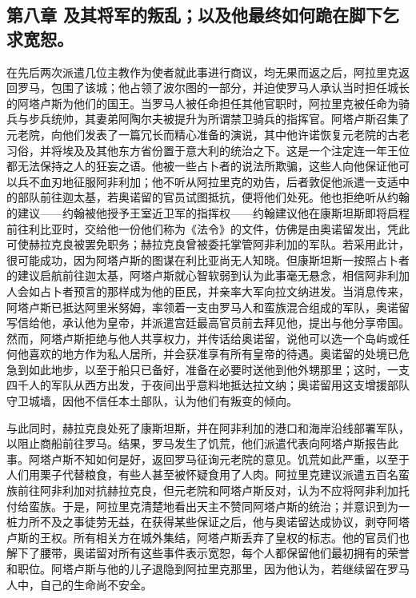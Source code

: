 
\subsection{第八章 及其将军的叛乱；以及他最终如何跪在脚下乞求宽恕。}

在先后两次派遣几位主教作为使者就此事进行商议，均无果而返之后，阿拉里克返回罗马，包围了该城；他占领了波尔图的一部分，并迫使罗马人承认当时担任城长的阿塔卢斯为他们的国王。当罗马人被任命担任其他官职时，阿拉里克被任命为骑兵与步兵统帅，其妻弟阿陶尔夫被提升为所谓禁卫骑兵的指挥官。阿塔卢斯召集了元老院，向他们发表了一篇冗长而精心准备的演说，其中他许诺恢复元老院的古老习俗，并将埃及及其他东方省份置于意大利的统治之下。这是一个注定连一年王位都无法保持之人的狂妄之语。他被一些占卜者的说法所欺骗，这些人向他保证他可以兵不血刃地征服阿非利加；他不听从阿拉里克的劝告，后者敦促他派遣一支适中的部队前往迦太基，若奥诺留的官员试图抵抗，便将他们处死。他也拒绝听从约翰的建议——约翰被他授予王室近卫军的指挥权——约翰建议他在康斯坦斯即将启程前往利比亚时，交给他一份他们称为《法令》的文件，仿佛是由奥诺留发出，凭此可使赫拉克良被罢免职务；赫拉克良曾被委托掌管阿非利加的军队。若采用此计，很可能成功，因为阿塔卢斯的图谋在利比亚尚无人知晓。但康斯坦斯一按照占卜者的建议启航前往迦太基，阿塔卢斯就心智软弱到认为此事毫无悬念，相信阿非利加人会如占卜者预言的那样成为他的臣民，并亲率大军向拉文纳进发。当消息传来，阿塔卢斯已抵达阿里米努姆，率领着一支由罗马人和蛮族混合组成的军队，奥诺留写信给他，承认他为皇帝，并派遣宫廷最高官员前去拜见他，提出与他分享帝国。然而，阿塔卢斯拒绝与他人共享权力，并传话给奥诺留，说他可以选一个岛屿或任何他喜欢的地方作为私人居所，并会获准享有所有皇帝的待遇。奥诺留的处境已危急到如此地步，以至于船只已备好，准备在必要时送他到他外甥那里；这时，一支四千人的军队从西方出发，于夜间出乎意料地抵达拉文纳；奥诺留用这支增援部队守卫城墙，因他不信任本土部队，认为他们有叛变的倾向。\par

与此同时，赫拉克良处死了康斯坦斯，并在阿非利加的港口和海岸沿线部署军队，以阻止商船前往罗马。结果，罗马发生了饥荒，他们派遣代表向阿塔卢斯报告此事。阿塔卢斯不知如何是好，返回罗马征询元老院的意见。饥荒如此严重，以至于人们用栗子代替粮食，有些人甚至被怀疑食用了人肉。阿拉里克建议派遣五百名蛮族前往阿非利加对抗赫拉克良，但元老院和阿塔卢斯反对，认为不应将阿非利加托付给蛮族。于是，阿拉里克清楚地看出天主不赞同阿塔卢斯的统治；并意识到为一桩力所不及之事徒劳无益，在获得某些保证之后，他与奥诺留达成协议，剥夺阿塔卢斯的王权。所有相关方在城外集结，阿塔卢斯丢弃了皇权的标志。他的官员们也解下了腰带，奥诺留对所有这些事件表示宽恕，每个人都保留他们最初拥有的荣誉和职位。阿塔卢斯与他的儿子退隐到阿拉里克那里，因为他认为，若继续留在罗马人中，自己的生命尚不安全。\par

